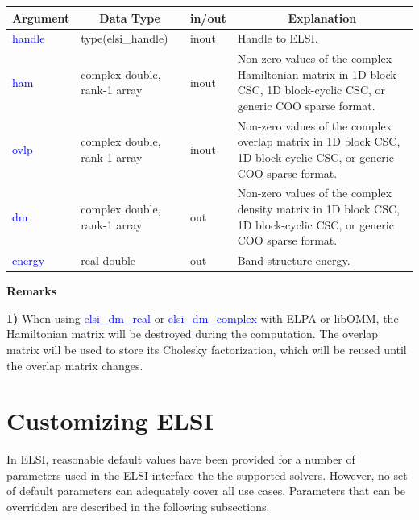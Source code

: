 \documentclass{report}
\begin{document}
\begin{tabular}[]{|p{20mm}|p{45mm}|p{15mm}|p{85mm}|}
\hline
\multicolumn{1}{|c|}{\textbf{Argument}} & \multicolumn{1}{c|}{\textbf{Data Type}} & \multicolumn{1}{c|}{\textbf{in/out}} & \multicolumn{1}{c|}{\textbf{Explanation}}\\
\hline
\textcolor{blue}{handle} & type(elsi\_handle)           & inout & Handle to ELSI.\\
\hline
\textcolor{blue}{ham}    & complex double, rank-1 array & inout & Non-zero values of the complex Hamiltonian matrix in 1D block CSC, 1D block-cyclic CSC, or generic COO sparse format.\\
\hline
\textcolor{blue}{ovlp}   & complex double, rank-1 array & inout & Non-zero values of the complex overlap matrix in 1D block CSC, 1D block-cyclic CSC, or generic COO sparse format.\\
\hline
\textcolor{blue}{dm}     & complex double, rank-1 array & out   & Non-zero values of the complex density matrix in 1D block CSC, 1D block-cyclic CSC, or generic COO sparse format.\\
\hline
\textcolor{blue}{energy} & real double                  & out   & Band structure energy.\\
\hline
\end{tabular}

\textbf{Remarks}

\textbf{1)} When using \textcolor{blue}{elsi\_dm\_real} or \textcolor{blue}{elsi\_dm\_complex} with ELPA or libOMM, the Hamiltonian matrix will be destroyed during the computation.  The overlap matrix will be used to store its Cholesky factorization, which will be reused until the overlap matrix changes.

\section{Customizing ELSI}
\label{sec:setter}
In ELSI, reasonable default values have been provided for a number of parameters used in the ELSI interface the the supported solvers.  However, no set of default parameters can adequately cover all use cases.  Parameters that can be overridden are described in the following subsections.
\end{document}
